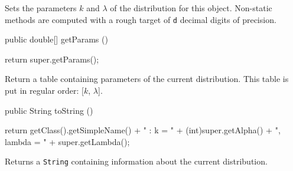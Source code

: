   \begin{tabb} Sets the parameters $k$ and $\lambda$ of the distribution for this
  object.  Non-static methods are computed with a rough target of
  \texttt{d} decimal digits of precision.
  \end{tabb}
\begin{code}

   public double[] getParams ()\begin{hide} {
      return super.getParams();
   }\end{hide}
\end{code}
\begin{tabb}
   Return a table containing parameters of the current distribution.
   This table is put in regular order: [$k$, $\lambda$].
\end{tabb}
\begin{hide}\begin{code}

   public String toString ()\begin{hide} {
      return getClass().getSimpleName() + " : k = " + (int)super.getAlpha() + ", lambda = " + super.getLambda();
   }\end{hide}
\end{code}
\begin{tabb}
   Returns a \texttt{String} containing information about the current distribution.
\end{tabb}\end{hide}
\begin{code}\begin{hide}
}\end{hide}
\end{code}
